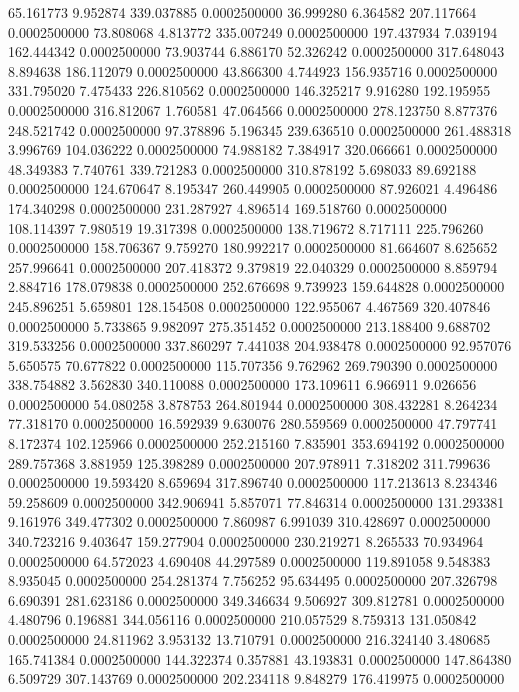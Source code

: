 65.161773 9.952874 339.037885 0.0002500000
36.999280 6.364582 207.117664 0.0002500000
73.808068 4.813772 335.007249 0.0002500000
197.437934 7.039194 162.444342 0.0002500000
73.903744 6.886170 52.326242 0.0002500000
317.648043 8.894638 186.112079 0.0002500000
43.866300 4.744923 156.935716 0.0002500000
331.795020 7.475433 226.810562 0.0002500000
146.325217 9.916280 192.195955 0.0002500000
316.812067 1.760581 47.064566 0.0002500000
278.123750 8.877376 248.521742 0.0002500000
97.378896 5.196345 239.636510 0.0002500000
261.488318 3.996769 104.036222 0.0002500000
74.988182 7.384917 320.066661 0.0002500000
48.349383 7.740761 339.721283 0.0002500000
310.878192 5.698033 89.692188 0.0002500000
124.670647 8.195347 260.449905 0.0002500000
87.926021 4.496486 174.340298 0.0002500000
231.287927 4.896514 169.518760 0.0002500000
108.114397 7.980519 19.317398 0.0002500000
138.719672 8.717111 225.796260 0.0002500000
158.706367 9.759270 180.992217 0.0002500000
81.664607 8.625652 257.996641 0.0002500000
207.418372 9.379819 22.040329 0.0002500000
8.859794 2.884716 178.079838 0.0002500000
252.676698 9.739923 159.644828 0.0002500000
245.896251 5.659801 128.154508 0.0002500000
122.955067 4.467569 320.407846 0.0002500000
5.733865 9.982097 275.351452 0.0002500000
213.188400 9.688702 319.533256 0.0002500000
337.860297 7.441038 204.938478 0.0002500000
92.957076 5.650575 70.677822 0.0002500000
115.707356 9.762962 269.790390 0.0002500000
338.754882 3.562830 340.110088 0.0002500000
173.109611 6.966911 9.026656 0.0002500000
54.080258 3.878753 264.801944 0.0002500000
308.432281 8.264234 77.318170 0.0002500000
16.592939 9.630076 280.559569 0.0002500000
47.797741 8.172374 102.125966 0.0002500000
252.215160 7.835901 353.694192 0.0002500000
289.757368 3.881959 125.398289 0.0002500000
207.978911 7.318202 311.799636 0.0002500000
19.593420 8.659694 317.896740 0.0002500000
117.213613 8.234346 59.258609 0.0002500000
342.906941 5.857071 77.846314 0.0002500000
131.293381 9.161976 349.477302 0.0002500000
7.860987 6.991039 310.428697 0.0002500000
340.723216 9.403647 159.277904 0.0002500000
230.219271 8.265533 70.934964 0.0002500000
64.572023 4.690408 44.297589 0.0002500000
119.891058 9.548383 8.935045 0.0002500000
254.281374 7.756252 95.634495 0.0002500000
207.326798 6.690391 281.623186 0.0002500000
349.346634 9.506927 309.812781 0.0002500000
4.480796 0.196881 344.056116 0.0002500000
210.057529 8.759313 131.050842 0.0002500000
24.811962 3.953132 13.710791 0.0002500000
216.324140 3.480685 165.741384 0.0002500000
144.322374 0.357881 43.193831 0.0002500000
147.864380 6.509729 307.143769 0.0002500000
202.234118 9.848279 176.419975 0.0002500000
